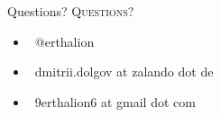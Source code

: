 \documentclass[usenames,dvipsnames, 18pt, compress, aspectratio=169]{beamer}
\def\twitter{{\FA \faTwitter}}
\def\email{{\FA \faEnvelope}}
\begin{document}





\fontsize{18pt}{18}\selectfont
\begin{frame}
  \vspace*{2.5cm}
  \begin{minipage}[b][\paperheight]{\textwidth}
  \begin{center}

      \linespread{1.0}%
      \if@noSmallCapitals%
        Questions?
      \else%
        \scshape{\color{black} Questions?}%
      \fi%
      \vspace*{0.3em}

      \fontsize{13pt}{14}\selectfont
        \begin{itemize}[label={}]
            \item {\color{black} \twitter\ @erthalion}
            \item {\color{black} \email\ dmitrii.dolgov at zalando dot de}
            \item {\color{black} \email\ 9erthalion6 at gmail dot com}
        \end{itemize}
      \vspace*{2.5em}%

    \vfill
    \vspace*{2em}
  \end{center}
  \end{minipage}

\end{frame}
\end{document}

